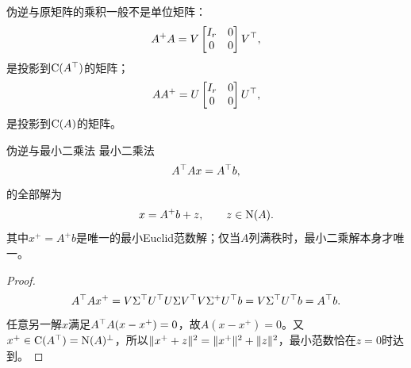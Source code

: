 \begin{remark}
	伪逆与原矩阵的乘积一般不是单位矩阵：
	\begin{equation}\label{eq:la-pseudoinverse-row-projector}
		A^+A = V\begin{bmatrix}
			I_r&0\\0&0
		\end{bmatrix}V^\top,
	\end{equation}
	是投影到$\operatorname{C}(A^\top)$的矩阵；
	\begin{equation}\label{eq:la-pseudoinverse-column-projector}
		AA^+ = U\begin{bmatrix}
			I_r&0\\0&0
		\end{bmatrix}U^\top,
	\end{equation}
	是投影到$\operatorname{C}(A)$的矩阵。
\end{remark}
\begin{theorem}{伪逆与最小二乘法}{}
	最小二乘法
	\[
		A^\top Ax = A^\top b,
	\]
	的全部解为
	\begin{equation}\label{eq:la-all-least-squares-solutions}
		x = A^+b + z,\qquad z \in \operatorname{N}(A).
	\end{equation}
	其中$x^+ = A^+b$是唯一的最小Euclid范数解；仅当$A$列满秩时，最小二乘解本身才唯一。
\end{theorem}
\begin{proof}
	\[
		A^\top Ax^+ = V\Sigma^\top U^\top U\Sigma V^\top V\Sigma^+U^\top b = V\Sigma^\top U^\top b = A^\top b.
	\]
	任意另一解$x$满足$A^\top A(x - x^+) = 0$，故$A(x - x^+) = 0$。又$x^+ \in \operatorname{C}(A^\top) = \operatorname{N}(A)^\perp$，所以$\lVert x^+ + z\rVert^2 = \lVert x^+\rVert^2 + \lVert z\rVert^2$，最小范数恰在$z = 0$时达到。
\end{proof}
